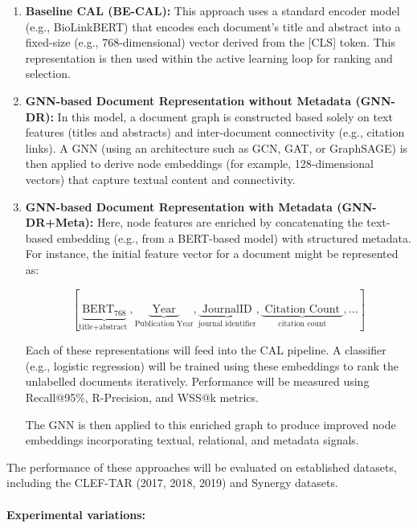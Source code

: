 \documentclass[10pt,oneside]{book}
\begin{document}
\begin{enumerate} \item \textbf{Baseline CAL (BE-CAL):}
This approach uses a standard encoder model (e.g., BioLinkBERT) that encodes each document’s title and abstract into a fixed-size (e.g., 768-dimensional) vector derived from the [CLS] token. This representation is then used within the active learning loop for ranking and selection.

\item \textbf{GNN-based Document Representation without Metadata (GNN-DR):}
In this model, a document graph is constructed based solely on text features (titles and abstracts) and inter-document connectivity (e.g., citation links). A GNN (using an architecture such as GCN, GAT, or GraphSAGE) is then applied to derive node embeddings (for example, 128-dimensional vectors) that capture textual content and connectivity.

\item \textbf{GNN-based Document Representation with Metadata (GNN-DR+Meta):}
Here, node features are enriched by concatenating the text-based embedding (e.g., from a BERT-based model) with structured metadata. For instance, the initial feature vector for a document might be represented as:


\[
[\underbrace{\mathrm{BERT}_{768}}_{\text {title+abstract }}, \underbrace{\text { Year }}_{\text{Publication Year}}, \underbrace{\text { JournalID }}_{\text{journal identifier}} , \underbrace{\text { Citation Count }}_{\text{citation count}} ,\ldots] 
\]

\vspace{0.5em}

Each of these representations will feed into the CAL pipeline. A classifier (e.g., logistic regression) will be trained using these embeddings to rank the unlabelled documents iteratively. Performance will be measured using Recall@95\%, R-Precision, and WSS@k metrics.

The GNN is then applied to this enriched graph to produce improved node embeddings incorporating textual, relational, and metadata signals. \end{enumerate}
The performance of these approaches will be evaluated on established datasets, including the CLEF-TAR (2017, 2018, 2019) and Synergy datasets.
\paragraph{Experimental variations:}
\end{document}
